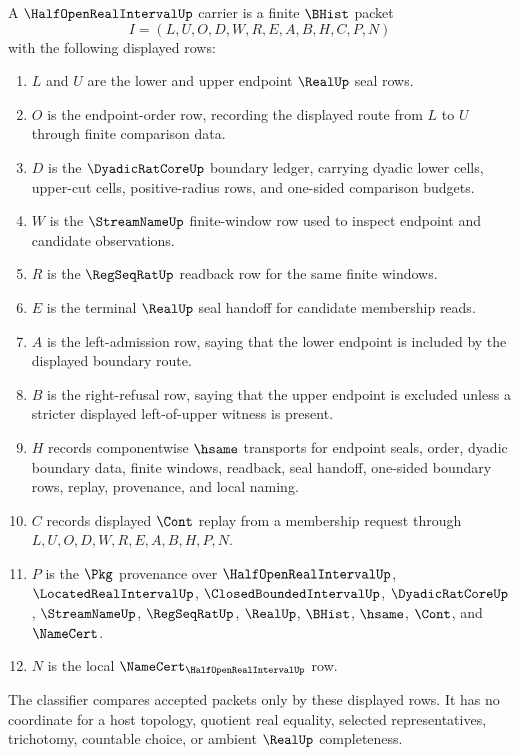 \begin{definition}
\label{def:half-open-real-interval-carrier}
A $\HalfOpenRealIntervalUp$ carrier is a finite $\BHist$ packet
$$
I=(L,U,O,D,W,R,E,A,B,H,C,P,N)
$$
with the following displayed rows:
\begin{enumerate}
\item $L$ and $U$ are the lower and upper endpoint $\RealUp$ seal rows.
\item $O$ is the endpoint-order row, recording the displayed route from $L$ to $U$ through finite comparison data.
\item $D$ is the $\DyadicRatCoreUp$ boundary ledger, carrying dyadic lower cells, upper-cut cells, positive-radius rows, and one-sided comparison budgets.
\item $W$ is the $\StreamNameUp$ finite-window row used to inspect endpoint and candidate observations.
\item $R$ is the $\RegSeqRatUp$ readback row for the same finite windows.
\item $E$ is the terminal $\RealUp$ seal handoff for candidate membership reads.
\item $A$ is the left-admission row, saying that the lower endpoint is included by the displayed boundary route.
\item $B$ is the right-refusal row, saying that the upper endpoint is excluded unless a stricter displayed left-of-upper witness is present.
\item $H$ records componentwise $\hsame$ transports for endpoint seals, order, dyadic boundary data, finite windows, readback, seal handoff, one-sided boundary rows, replay, provenance, and local naming.
\item $C$ records displayed $\Cont$ replay from a membership request through $L,U,O,D,W,R,E,A,B,H,P,N$.
\item $P$ is the $\Pkg$ provenance over $\HalfOpenRealIntervalUp$, $\LocatedRealIntervalUp$, $\ClosedBoundedIntervalUp$, $\DyadicRatCoreUp$, $\StreamNameUp$, $\RegSeqRatUp$, $\RealUp$, $\BHist$, $\hsame$, $\Cont$, and $\NameCert$.
\item $N$ is the local $\NameCert_{\HalfOpenRealIntervalUp}$ row.
\end{enumerate}
The classifier compares accepted packets only by these displayed rows. It has no coordinate for a host topology, quotient real equality, selected representatives, trichotomy, countable choice, or ambient $\RealUp$ completeness.
\end{definition}

